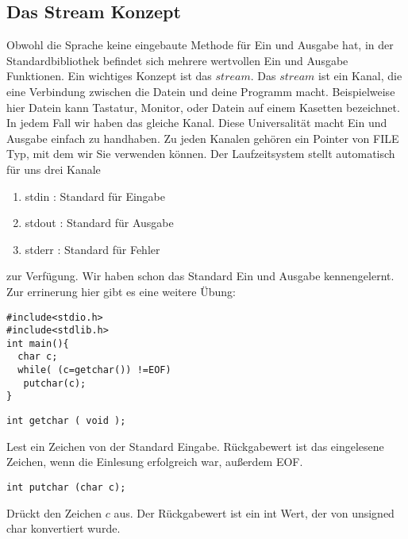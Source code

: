 \documentclass{article}[12pt]
\newenvironment{myexampleblock}[1]{%
    \tcolorbox[beamer,%
    noparskip,breakable,
    colback=White,colframe=ForestGreen,%
    colbacklower=LimeGreen!75!White,%
    title=#1]}%
    {\endtcolorbox}
\newenvironment{myexampleprogram}[1]{%
    \tcolorbox[beamer,%
    noparskip,breakable,
    colback=White,colframe=Goldenrod,%
    colbacklower=Yellow!75!White,%
    title=#1]}%
    {\endtcolorbox}
\begin{document}
\subsection{Das Stream Konzept}

Obwohl die Sprache keine eingebaute Methode für Ein und Ausgabe hat, in der Standardbibliothek befindet sich
mehrere wertvollen Ein und Ausgabe Funktionen. Ein wichtiges Konzept ist das $stream$. Das $stream$ ist ein Kanal, die
eine Verbindung zwischen die Datein und deine Programm macht. Beispielweise hier Datein kann  Tastatur, 
Monitor, oder Datein auf einem Kasetten bezeichnet. In jedem Fall wir haben das gleiche Kanal.
Diese Universalität macht Ein und Ausgabe einfach zu handhaben. Zu jeden Kanalen gehören ein Pointer von FILE Typ,
mit dem wir Sie verwenden können. Der Laufzeitsystem stellt automatisch für uns drei Kanale
\begin{enumerate}
\item stdin : Standard für Eingabe 
\item stdout : Standard für Ausgabe
\item stderr : Standard für Fehler
\end{enumerate} zur Verfügung. Wir haben schon das Standard Ein und Ausgabe kennengelernt. Zur errinerung hier gibt es
eine weitere Übung:
\begin{myexampleprogram}{Programme: \texttt{Eingabe nach Ausgabe Kopieren}}
\begin{lstlisting}
#include<stdio.h>
#include<stdlib.h>
int main(){
  char c;
  while( (c=getchar()) !=EOF)
   putchar(c);
}
\end{lstlisting}
\end{myexampleprogram}
\begin{myexampleblock}{Funktion: \texttt{getchar}}
\begin{lstlisting}
int getchar ( void );
\end{lstlisting}
\vspace{-0.4cm}
Lest ein Zeichen von der Standard Eingabe. Rückgabewert ist das eingelesene Zeichen, wenn die Einlesung erfolgreich war, außerdem
EOF.
\end{myexampleblock}
\begin{myexampleblock}{Funktion: \texttt{putchar}}
\begin{lstlisting}
int putchar (char c);
\end{lstlisting}
\vspace{-0.4cm}
Drückt den Zeichen $c$ aus. Der Rückgabewert ist ein int Wert, der von unsigned char konvertiert wurde.
\end{myexampleblock}
\end{document}

